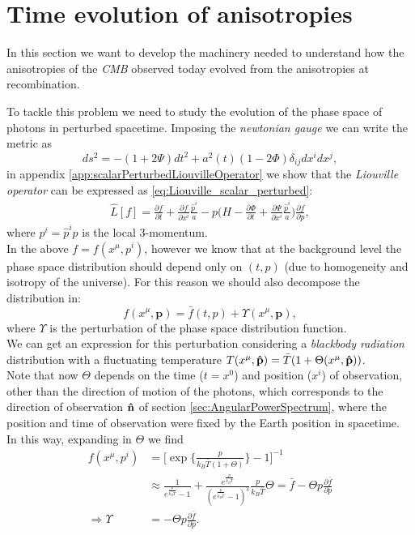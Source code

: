 \section{Time evolution of anisotropies}\label{sec:ThetaTimeEvolution}
In this section we want to develop the machinery needed to understand how the anisotropies of the \emph{CMB} observed today evolved from the anisotropies at recombination.

To tackle this problem we need to study the evolution of the phase space of photons in perturbed spacetime. Imposing the \emph{newtonian gauge} we can write the metric as
$$ds^2 = -(1+2\Psi)dt^2 + a^2(t)(1-2\Phi)\delta_{ij}dx^idx^j,$$
in appendix \ref{app:scalarPerturbedLiouvilleOperator} we show that the \emph{Liouville operator} can be expressed as \eqref{eq:Liouville_scalar_perturbed}:
\begin{align*}
    \hat{L}[f]=\frac{\partial f}{\partial t}+\frac{\partial f}{\partial x^i}\frac{\hat p^i}{a}-p\bigg(H-\frac{\partial \Phi}{\partial t}+\frac{\partial \Psi}{\partial x^i}\frac{\hat p^i}{a}\bigg)\frac{\partial f}{\partial p},
\end{align*}
where $p^i=\hat p^i p$ is the local 3-momentum.\\In the above $f=f(x^\mu,p^i)$, however we know that at the background level the phase space distribution should depend only on $(t,p)$ (due to homogeneity and isotropy of the universe). For this reason we should also decompose the distribution in:
\begin{equation}\label{eq:phspdist_perturb}
    f(x^\mu,\mathbf p) = \bar f(t,p) + \Upsilon (x^\mu,\mathbf{p}),
\end{equation}
where $\Upsilon$ is the perturbation of the phase space distribution function.\\
We can get an expression for this perturbation considering a \emph{blackbody radiation} distribution with a fluctuating temperature $T(x^\mu,\mathbf{\hat{p}})=\bar T (1+\Theta(x^\mu,\mathbf{\hat{p}}))$.\\ Note that now $\Theta$ depends on the time ($t=x^0$) and position ($x^i$) of observation, other than the direction of motion of the photons, which corresponds to the direction of observation $\mathbf{\hat{n}}$ of section \ref{sec:AngularPowerSpectrum}, where the position and time of observation were fixed by the Earth position in spacetime.\\  In this way, expanding in $\Theta$ we find
\begin{align*}
    f(x^\mu,p^i) &= \bigg[\exp\bigg\{\frac{p}{k_B\bar T(1+\Theta)}\bigg\}-1\bigg]^{-1}\\&\approx\frac{1}{e^{\frac{p}{k_B\bar T}}-1}+\frac{e^{\frac{p}{k_B\bar T}}}{(e^{\frac{p}{k_B\bar T}}-1)^2}\frac{p}{k_B \bar T}\Theta=\bar f-\Theta p \frac{\partial\bar f}{\partial p}\\
    \Longrightarrow \Upsilon &= -\Theta p \frac{\partial\bar f}{\partial p}.
\end{align*}
